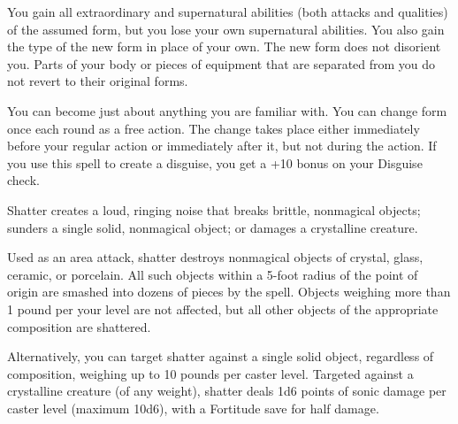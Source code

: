 \begin{multicols}{2}
\begin{small}
\smallskip\noindent You gain all extraordinary and supernatural abilities (both attacks and qualities) of the assumed form, but you lose your own supernatural abilities. You also gain the type of the new form in place of your own. The new form does not disorient you. Parts of your body or pieces of equipment that are separated from you do not revert to their original forms.

\smallskip\noindent You can become just about anything you are familiar with. You can change form once each round as a free action. The change takes place either immediately before your regular action or immediately after it, but not during the action. If you use this spell to create a disguise, you get a +10 bonus on your Disguise check.


\smallskip\noindent Shatter creates a loud, ringing noise that breaks brittle, nonmagical objects; sunders a single solid, nonmagical object; or damages a crystalline creature.

\smallskip\noindent Used as an area attack, shatter destroys nonmagical objects of crystal, glass, ceramic, or porcelain. All such objects within a 5-foot radius of the point of origin are smashed into dozens of pieces by the spell. Objects weighing more than 1 pound per your level are not affected, but all other objects of the appropriate composition are shattered.

\smallskip\noindent Alternatively, you can target shatter against a single solid object, regardless of composition, weighing up to 10 pounds per caster level. Targeted against a crystalline creature (of any weight), shatter deals 1d6 points of sonic damage per caster level (maximum 10d6), with a Fortitude save for half damage.



\end{small}
\end{multicols}
